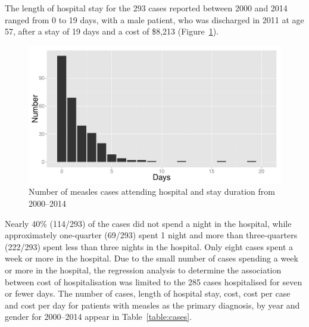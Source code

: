 \documentclass{article}
\begin{document}
The length of hospital stay for the 293 cases reported between 2000 and 2014 ranged from 0 to 19 days, with a male patient, who was discharged in 2011 at age 57, after a stay of 19 days and a cost of \$8,213 (Figure~\ref{fig:hosp}).


\begin{figure}[h!]
\begin{center}
\includegraphics{draftfinalreport-047}
\end{center}
\caption{Number of measles cases attending hospital and stay duration from 2000--2014}
\label{fig:hosp}
\end{figure}

Nearly 40\% (114/293) of the cases did not spend a night in the hospital, while approximately one-quarter (69/293) spent 1 night and more than three-quarters (222/293) spent less than three nights in the hospital. Only eight cases spent a week or more in the hospital. Due to the small number of cases spending a week or more in the hospital, the regression analysis to determine the association between cost of hospitalisation was limited to the 285 cases hospitalised for seven or fewer days. The number of cases, length of hospital stay, cost, cost per case and cost per day for patients with measles as the primary diagnosis, by year and gender for 2000--2014 appear in Table~\ref{table:cases}.
\end{document}
